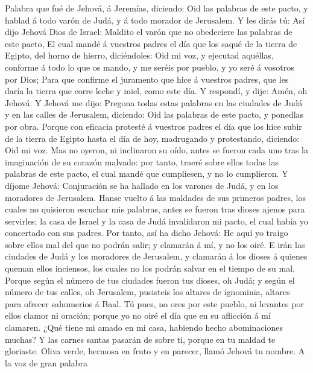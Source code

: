  Palabra que fué de Jehová, á Jeremías, diciendo:
 Oid las palabras de este pacto, y hablad á todo varón de
Judá, y á todo morador de Jerusalem.  Y les dirás tú: Así
dijo Jehová Dios de Israel: Maldito el varón que no obedeciere las
palabras de este pacto,  El cual mandé á vuestros padres el
día que los saqué de la tierra de Egipto, del horno de hierro,
diciéndoles: Oid mi voz, y ejecutad aquéllas, conforme á todo lo que os
mando, y me seréis por pueblo, y yo seré á vosotros por Dios;
 Para que confirme el juramento que hice á vuestros padres,
que les daría la tierra que corre leche y miel, como este día. Y
respondí, y dije: Amén, oh Jehová.  Y Jehová me dijo:
Pregona todas estas palabras en las ciudades de Judá y en las calles de
Jerusalem, diciendo: Oid las palabras de este pacto, y ponedlas por
obra.  Porque con eficacia protesté á vuestros padres el día
que los hice subir de la tierra de Egipto hasta el día de hoy,
madrugando y protestando, diciendo: Oid mi voz.  Mas no
oyeron, ni inclinaron su oído, antes se fueron cada uno tras la
imaginación de su corazón malvado: por tanto, traeré sobre ellos todas
las palabras de este pacto, el cual mandé que cumpliesen, y no lo
cumplieron.  Y díjome Jehová: Conjuración se ha hallado en
los varones de Judá, y en los moradores de Jerusalem. 
Hanse vuelto á las maldades de sus primeros padres, los cuales no
quisieron escuchar mis palabras, antes se fueron tras dioses ajenos para
servirles; la casa de Israel y la casa de Judá invalidaron mi pacto, el
cual había yo concertado con sus padres.  Por tanto, así ha
dicho Jehová: He aquí yo traigo sobre ellos mal del que no podrán salir;
y clamarán á mí, y no los oiré.  E irán las ciudades de
Judá y los moradores de Jerusalem, y clamarán á los dioses á quienes
queman ellos inciensos, los cuales no los podrán salvar en el tiempo de
su mal.  Porque según el número de tus ciudades fueron tus
dioses, oh Judá; y según el número de tus calles, oh Jerusalem,
pusisteis los altares de ignominia, altares para ofrecer sahumerios á
Baal.  Tú pues, no ores por este pueblo, ni levantes por
ellos clamor ni oración; porque yo no oiré el día que en su aflicción á
mí clamaren.  ¿Qué tiene mi amado en mi casa, habiendo
hecho abominaciones muchas? Y las carnes santas pasarán de sobre ti,
porque en tu maldad te gloriaste.  Oliva verde, hermosa en
fruto y en parecer, llamó Jehová tu nombre. A la voz de gran palabra
